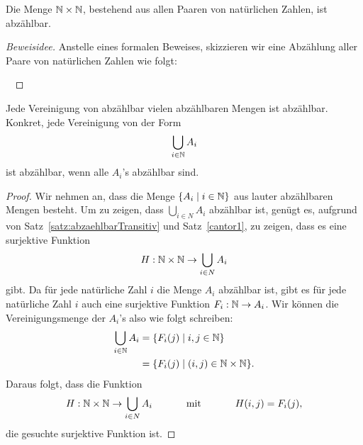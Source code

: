 \begin{satz}\label{cantor1}
Die Menge $\mathbb{N}\times\mathbb{N}$, bestehend aus allen Paaren von natürlichen Zahlen, ist abzählbar.
\end{satz}
\begin{proof}[Beweisidee]
Anstelle eines formalen Beweises, skizzieren wir eine Abzählung aller Paare von natürlichen Zahlen wie folgt:
\begin{center}
\end{center}
\ %
\end{proof}
\begin{satz}\label{satz:countableUnion}
Jede Vereinigung von abzählbar vielen abzählbaren Mengen ist abzählbar. Konkret, jede Vereinigung von der Form
\[
\bigcup_{i\in\mathbb{N}}A_i
\]
ist abzählbar, wenn alle $A_i$'s abzählbar sind.
\end{satz}
\begin{proof}
Wir nehmen an, dass die Menge $\{A_i\mid i\in \mathbb{N} \}$ aus lauter abzählbaren Mengen besteht. Um zu zeigen, dass $\bigcup_{i\in N}A_i$ abzählbar ist, genügt es, aufgrund von Satz~\ref{satz:abzaehlbarTransitiv} und Satz~\ref{cantor1}, zu zeigen, dass es eine surjektive Funktion
\[
H:\mathbb{N}\times\mathbb{N}\to\bigcup_{i\in N}A_i
\]
gibt. Da für jede natürliche Zahl $i$ die Menge $A_i$ abzählbar ist, gibt es für jede natürliche Zahl $i$ auch eine surjektive Funktion $F_i:\mathbb{N}\to A_i$. Wir können die Vereinigungsmenge der $A_i$'s also wie folgt schreiben:
\begin{align*}
\bigcup_{i\in \mathbb{N}}A_i&=\{F_i(j)\mid i,j\in\mathbb{N} \}\\
&=\{F_i(j)\mid (i,j)\in\mathbb{N}\times\mathbb{N} \}.
\end{align*}
Daraus folgt, dass die Funktion
\[
H:\mathbb{N}\times\mathbb{N}\to \bigcup_{i\in N}A_i\phantom{abstand}\text{mit}\phantom{abstand} H(i,j)=F_i(j),
\]
die gesuchte surjektive Funktion ist.
\end{proof}

